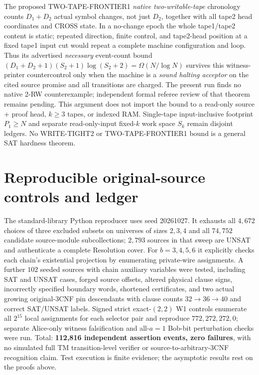 The proposed TWO-TAPE-FRONTIER1 \emph{native two-writable-tape} chronology counts $D_1+D_2$ actual symbol changes, not just $D_2$, together with all tape2 head coordinates and CROSS state. In a no-change epoch the whole tape1/tape2 content is static; repeated direction, finite control, and tape2-head position at a fixed tape1 input cut would repeat a complete machine configuration and loop. Thus its advertised \emph{necessary} event-count bound $(D_1+D_2+1)(S_2+1)\log(S_2+2)=\Omega(N/\log N)$ survives this witness-printer countercontrol only when the machine is a \emph{sound halting acceptor} on the cited source promise and all transitions are charged. The present run finds no native 2-RW counterexample; independent formal referee review of that theorem remains pending. This argument does not import the bound to a read-only source + proof head, $k\ge3$ tapes, or indexed RAM. Single-tape input-inclusive footprint $P_1\ge N$ and separate read-only-input fixed-$k$ work space $S_k$ remain disjoint ledgers. No WRITE-TIGHT2 or TWO-TAPE-FRONTIER1 bound is a general SAT hardness theorem.

\section{Reproducible original-source controls and ledger}
The standard-library Python reproducer  uses seed 20261027. It exhausts all $4,672$ choices of three excluded subsets on universes of sizes $2,3,4$ and all $74,752$ candidate source-module subcollections; $2,793$ sources in that sweep are UNSAT and authenticate a complete Resolution cover. For $b=3,4,5,6$ it explicitly checks each chain's existential projection by enumerating private-wire assignments. A further $102$ seeded sources with chain auxiliary variables were tested, including SAT and UNSAT cases, forged source offsets, altered physical clause signs, incorrectly specified boundary words, shortened certificates, and two actual growing original-3CNF pin descendants with clause counts $32\to36\to40$ and correct SAT/UNSAT labels. Signed strict exact-$(2,2)$ W1 controls enumerate all $2^{15}$ local assignments for each selector pair and reproduce $772,272,272,0$; separate Alice-only witness falsification and all-$a=1$ Bob-bit perturbation checks were run. Total: \textbf{112,816 independent assertion events, zero failures}, with no simulated full TM transition-level verifier or source-to-arbitrary-3CNF recognition claim. Test execution is finite evidence; the asymptotic results rest on the proofs above.

